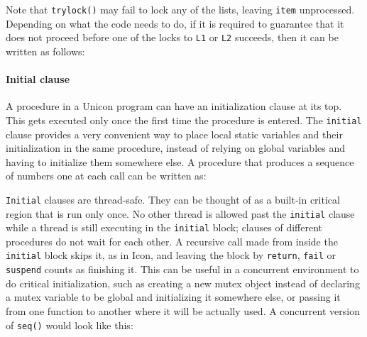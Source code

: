 
Note that \texttt{trylock()} may fail to lock any of the lists, leaving
\texttt{item} unprocessed. Depending on what the code needs to do, if it is
required to guarantee that it does not proceed before one of the locks to
\texttt{L1} or \texttt{L2} succeeds, then it can be written as follows:


\paragraph{Initial clause}

A procedure in a Unicon program can have an initialization clause at its top.
This gets executed only once the first time the procedure is entered. The
\texttt{initial} clause provides a very convenient way to place local static
variables and their initialization in the same procedure, instead of relying on
global variables and having to initialize them somewhere else.  A procedure that
produces a sequence of numbers one at each call can be written as:


\texttt{Initial} clauses are thread-safe. They can be thought of as a built-in
critical region that is run only once. No other thread is allowed past the
\texttt{initial} clause while a thread is still executing in the
\texttt{initial} block; clauses of different procedures do not wait for each
other. A recursive call made from inside the \texttt{initial} block skips
it, as in Icon, and leaving the block by \texttt{return}, \texttt{fail} or
\texttt{suspend} counts as finishing it. This can be useful in a concurrent environment to do critical
initialization, such as creating a new mutex object instead of declaring a mutex
variable to be global and initializing it somewhere else, or passing it from one
function to another where it will be actually used.  A concurrent version of
\texttt{seq()} would look like this:

